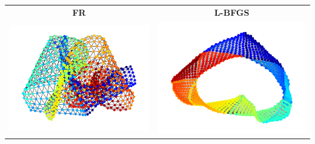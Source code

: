 \documentclass[dvipdfmx,journal]{IEEEtran}
\begin{document}
\begin{table}[t]
  \centering
  \begin{tabular}{cc}
    \large{\textbf{FR}}                                          & \large{\textbf{L-BFGS}}   \\
    \begin{minipage}{0.45\columnwidth}
      \centering
      \includegraphics[width=\columnwidth]{jagmesh1_FR_50iter.png}
    \end{minipage} &
    \begin{minipage}{0.45\columnwidth}
      \centering
      \includegraphics[width=\columnwidth]{jagmesh1_LBFGS_50iter.png}
    \end{minipage}                           \\

\end{tabular}
\end{table}
\end{document}
